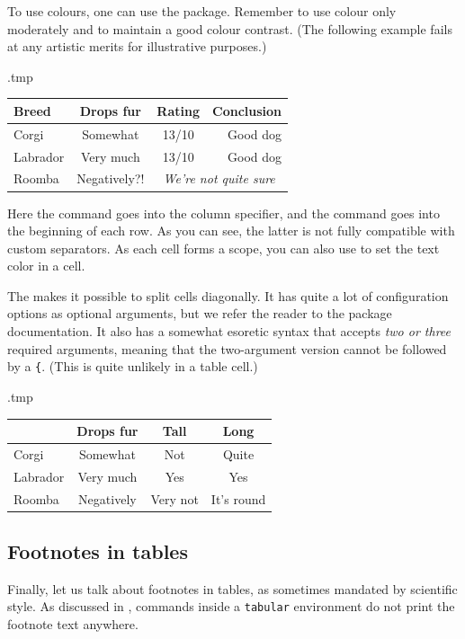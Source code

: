 To use colours, one can use the  package.
Remember to use colour only moderately and to maintain a good colour contrast.
(The following example fails at any artistic merits for illustrative purposes.)
%
\begin{VerbatimOut}{\jobname.tmp}
\centering
\begin{tabular}{>{\columncolor{green!15}}l | c c @{ $\Rightarrow$ } r}
\rowcolor{blue!15} Breed & Drops fur & Rating & Conclusion\\
\hline
Corgi & Somewhat & 13/10 & Good dog\\
Labrador & Very much & 13/10 & Good dog\\
Roomba & \cellcolor{orange!20} Negatively?! &
    \multicolumn{2}{c}{\emph{We're not quite sure}}
\end{tabular}
\end{VerbatimOut}
\ShowExampleBelow
%
Here the  command goes into the column specifier, and
the  command goes into the beginning of each row.
As you can see, the latter is not fully compatible with custom separators.
As each cell forms a scope, you can also use  to set the text color in a cell.

The  makes it possible to split cells diagonally.
It has quite a lot of configuration options as optional arguments,
but we refer the reader to the package documentation.
It also has a somewhat esoretic syntax that accepts \emph{two or three} required arguments,
meaning that the two-argument version cannot be followed by a \verb|{|.
(This is quite unlikely in a table cell.)
%
\begin{VerbatimOut}{\jobname.tmp}
\centering
\begin{tabular}{l|ccc}
  \diagbox{Breed}{Property} & Drops fur & Tall & Long\\
  \hline
  Corgi & Somewhat & Not & Quite\\
  Labrador & Very much & Yes & Yes\\
  Roomba & Negatively & Very not & It's round
\end{tabular}
\end{VerbatimOut}
\ShowExampleBelow



%
%
\subsection{Footnotes in tables}\label{sec:table footnotes}

Finally, let us talk about footnotes in tables,
as sometimes mandated by scientific style.
As discussed in ,
 commands inside a \verb|tabular| environment
do not print the footnote text anywhere.

